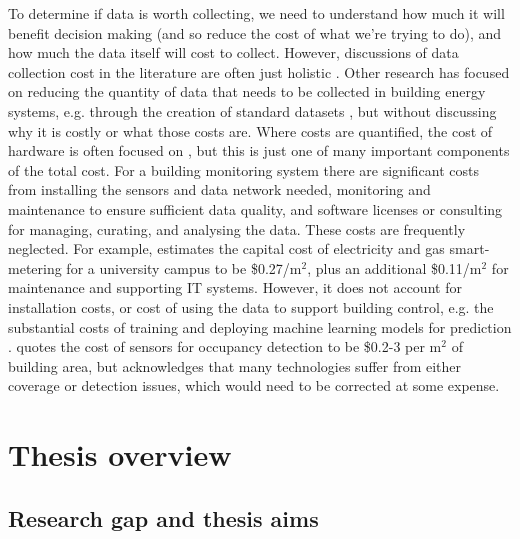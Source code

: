 To determine if data is worth collecting, we need to understand how much it will benefit decision making (and so reduce the cost of what we're trying to do), and how much the data itself will cost to collect. However, discussions of data collection cost in the literature are often just holistic . Other research has focused on reducing the quantity of data that needs to be collected in building energy systems, e.g. through the creation of standard datasets , but without discussing why it is costly or what those costs are.
Where costs are quantified, the cost of hardware is often focused on , but this is just one of many important components of the total cost. For a building monitoring system there are significant costs from installing the sensors and data network needed, monitoring and maintenance to ensure sufficient data quality, and software licenses or consulting for managing, curating, and analysing the data. These costs are frequently neglected.
For example,  estimates the capital cost of electricity and gas smart-metering for a university campus to be \$0.27/m$^2$, plus an additional \$0.11/m$^2$ for maintenance and supporting IT systems. However, it does not account for installation costs, or cost of using the data to support building control, e.g. the substantial costs of training and deploying machine learning models for prediction .
 quotes the cost of sensors for occupancy detection to be \$0.2-3 per m$^2$ of building area, but acknowledges that many technologies suffer from either coverage or detection issues, which would need to be corrected at some expense.\\



\newpage

\section{Thesis overview}

\subsection{Research gap and thesis aims}

